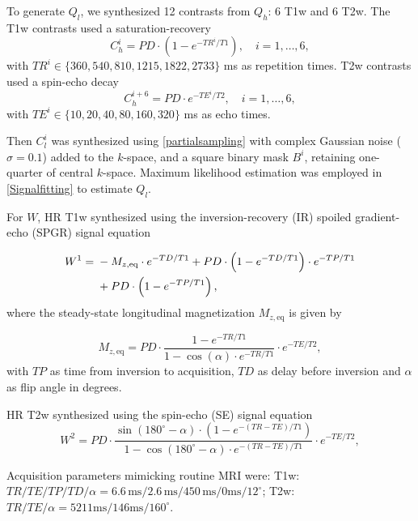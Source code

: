 \documentclass[journal,twoside,web]{ieeecolor}
\begin{document}
To generate \( Q_l \), we synthesized 12 contrasts from \( Q_h \): 6 T1w and 6 T2w. The T1w contrasts used a saturation-recovery
\begin{equation}
    C_h^i = PD \cdot \left( 1 - e^{-TR^i/T1} \right), \quad i = 1, \dots, 6,
\end{equation}  
with $TR^i \in \{360, 540, 810, 1215, 1822, 2733\}$ ms as repetition times. T2w contrasts used a spin-echo decay
\begin{equation}
    C_h^{i+6} = PD \cdot e^{-TE^i/T2}, \quad i = 1, \dots, 6,
\end{equation}  
with $TE^i \in \{10, 20, 40, 80, 160, 320\}$ ms as echo times.

Then \( C_l^i \) was synthesized using \eqref{partialsampling} with complex Gaussian noise ($\sigma = 0.1$) added to the \( k\)-space, and a square binary mask \( B^i \), retaining one-quarter of central  \(k\)-space.
Maximum likelihood estimation was employed in \eqref{Signalfitting} to estimate \( Q_l \).

For \( W \), HR T1w synthesized using the inversion-recovery (IR) spoiled gradient-echo (SPGR) signal equation

\begin{align}
W^1 =\;& 
    - M_{z,\mathrm{eq}} \cdot e^{-TD / T1} 
    + PD \cdot \left( 1 - e^{-TD / T1} \right) \cdot e^{-TP / T1} \notag \\
    &+ PD \cdot \left( 1 - e^{-TP / T1} \right),
    \label{IR-GRE}
\end{align}
where the steady-state longitudinal magnetization \( M_{z,\mathrm{eq}} \) is given by

\begin{equation}
M_{z,\mathrm{eq}} = PD \cdot \frac{1 - e^{-TR / T1}}{1 - \cos(\alpha) \cdot e^{-TR / T1}} \cdot e^{-TE / T2},
\end{equation}
with \( TP \) as time from inversion to acquisition, \( TD \) as delay before inversion and \( \alpha \) as flip angle in degrees.

HR T2w synthesized using the spin-echo (SE) signal equation
\begin{equation}
W^2 = PD \cdot \frac{\sin(180^\circ - \alpha) \cdot \left(1 - e^{-(TR - TE)/T1} \right)}{1 - \cos(180^\circ - \alpha) \cdot e^{-(TR - TE)/T1}} \cdot e^{-TE/T2},
\label{PROPELLER}
\end{equation}

Acquisition parameters mimicking routine MRI were: T1w: \( TR/TE/TP/TD/\alpha = 6.6\,\mathrm{ms}/2.6\,\mathrm{ms}/450\,\mathrm{ms}/0 \mathrm{ms}/12^\circ\); T2w: \(
TR/TE/\alpha = 5211\mathrm{ms}/146\mathrm{ms}/160^\circ
\).
\end{document}
